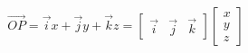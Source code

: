 \documentclass{article}
\begin{document}
\thispagestyle{empty}

$$
\overrightarrow{OP} = \vec{i}x + \vec{j}y + \vec{k}z = \begin{bmatrix}\vec{i} & \vec{j} & \vec{k}\end{bmatrix}\begin{bmatrix}x \\ y \\ z\end{bmatrix}
$$
\end{document}
